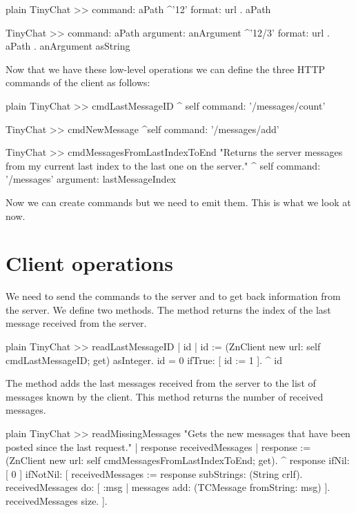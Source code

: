 \documentclass[10pt,twoside,english]{_support/latex/sbabook/sbabook}
\begin{document}
\begin{displaycode}{plain}
TinyChat >> command: aPath
	^'{1}{2}' format: { url . aPath }

TinyChat >> command: aPath argument: anArgument
	^'{1}{2}/{3}' format: { url . aPath . anArgument asString }
\end{displaycode}

Now that we have these low-level operations we can define the three HTTP commands of the client as follows:

\begin{displaycode}{plain}
TinyChat >> cmdLastMessageID
	^ self command: '/messages/count'

TinyChat >> cmdNewMessage
	^self command: '/messages/add'

TinyChat >> cmdMessagesFromLastIndexToEnd
	"Returns the server messages from my current last index to the last one on the server."
	^ self command: '/messages' argument: lastMessageIndex
\end{displaycode}

Now we can create commands but we need to emit them. This is what we look at now.
\section{Client operations}
We need to send the commands to the server and to get back information from the server.
We define two methods. The method  returns the index of the last message received from the server.

\begin{displaycode}{plain}
TinyChat >> readLastMessageID
	| id |
	id := (ZnClient new url: self cmdLastMessageID; get) asInteger.
	id = 0 ifTrue: [ id := 1 ].
	^ id
\end{displaycode}

The method  adds the last messages received from the server to the list of messages known by the client. 
This method returns the number of received messages. 

\begin{displaycode}{plain}
TinyChat >> readMissingMessages
	"Gets the new messages that have been posted since the last request."
	| response receivedMessages |
	response := (ZnClient new url: self cmdMessagesFromLastIndexToEnd; get).
	^ response 
		ifNil: [ 0 ]
		ifNotNil: [  
			receivedMessages := response subStrings: (String crlf).
			receivedMessages do: [ :msg | messages add: (TCMessage fromString: msg) ].
			receivedMessages size.
		].
\end{displaycode}
\end{document}
